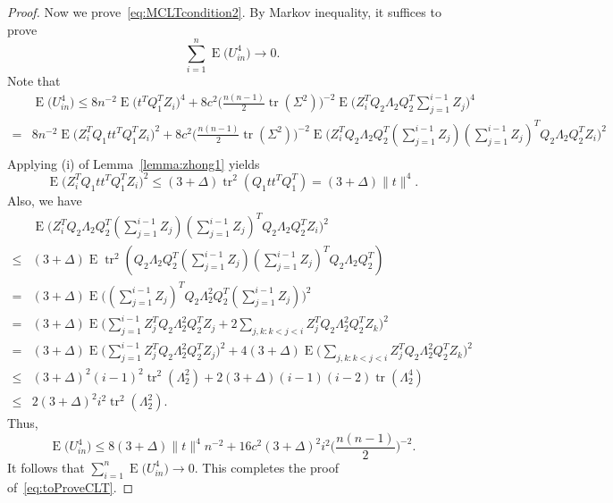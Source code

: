 \documentclass[review]{elsarticle}
\DeclareMathOperator{\mytr}{tr}
\DeclareMathOperator{\myE}{E}
\theoremstyle{plain}
\theoremstyle{definition}
\theoremstyle{remark}
\begin{document}
\begin{proof}
     Now we prove~\eqref{eq:MCLTcondition2}.
     By Markov inequality, it suffices to prove
     $$
         \sum_{i=1}^n \myE\big(U_{in}^4\big)\to 0.
     $$
     Note that
     $$
     \begin{aligned}
         &\myE\big(U_{in}^4\big)
         \leq
         8n^{-2}\myE \big(t^T Q_1^T Z_i\big)^4+
         8c^2  
         \big(\frac{n(n-1)}{2} \mytr(\Sigma^2)\big)^{-2}
         \myE\big( Z_i^T Q_2 \Lambda_2 Q_2^T \sum_{j=1}^{i-1}Z_j\big)^4
         \\
         =&
         8n^{-2}\myE \big( Z_i^T Q_1 t t^T Q_1^T Z_i\big)^2+
         8c^2  
         \big(\frac{n(n-1)}{2} \mytr(\Sigma^2)\big)^{-2}
         \myE\big( Z_i^T Q_2 \Lambda_2 Q_2^T (\sum_{j=1}^{i-1}Z_j)(\sum_{j=1}^{i-1}Z_j)^T Q_2 \Lambda_2 Q_2^T Z_i\big)^2
         \\
     \end{aligned}
     $$
    Applying (i) of Lemma~\ref{lemma:zhong1} yields
    $$
         \myE \big( Z_i^T Q_1 t t^T Q_1^T Z_i\big)^2
         \leq (3+\Delta)\mytr^2 (Q_1 t t^T Q_1^T)
         = (3+\Delta) \|t\|^4.
    $$
    Also, we have
    $$
    \begin{aligned}
        &\myE\big( Z_i^T Q_2 \Lambda_2 Q_2^T (\sum_{j=1}^{i-1}Z_j)(\sum_{j=1}^{i-1}Z_j)^T Q_2 \Lambda_2 Q_2^T Z_i\big)^2
        \\
        \leq &
        (3+\Delta)\myE \mytr^2 (Q_2 \Lambda_2 Q_2^T (\sum_{j=1}^{i-1}Z_j)(\sum_{j=1}^{i-1}Z_j)^T Q_2 \Lambda_2 Q_2^T)
        \\
        = &
        (3+\Delta)\myE  \Big((\sum_{j=1}^{i-1}Z_j)^T Q_2 \Lambda_2^2 Q_2^T (\sum_{j=1}^{i-1}Z_j)\Big)^2
        \\
        = &
        (3+\Delta)\myE  \Big(\sum_{j=1}^{i-1}Z_j^T Q_2 \Lambda_2^2 Q_2^T Z_j+2\sum_{j,k:k<j<i}Z_j^T Q_2 \Lambda_2^2 Q_2^T Z_k\Big)^2
        \\
        = &
        (3+\Delta)\myE  \Big(\sum_{j=1}^{i-1}Z_j^T Q_2 \Lambda_2^2 Q_2^T Z_j \Big)^2+4(3+\Delta)\myE \Big(\sum_{j,k:k<j<i}Z_j^T Q_2 \Lambda_2^2 Q_2^T Z_k\Big)^2
        \\
        \leq &
        (3+\Delta)^2 (i-1)^2 \mytr^2 (\Lambda_2^2)  +2(3+\Delta)(i-1)(i-2)\mytr(\Lambda_2^4)
        \\
        \leq &
        2(3+\Delta)^2 i^2 \mytr^2 (\Lambda_2^2).
    \end{aligned}
    $$
    Thus,
     $$
         \myE\big(U_{in}^4\big)
         \leq 8 (3+\Delta)\|t\|^4 n^{-2}+
         16 c^2 (3+\Delta)^2 i^2 \big(\frac{n(n-1)}{2}\big)^{-2}.
     $$
     It follows that
     $
         \sum_{i=1}^n \myE\big(U_{in}^4\big)
        \to 0.
     $
     This completes the proof of~\eqref{eq:toProveCLT}.


\end{proof}
\end{document}
